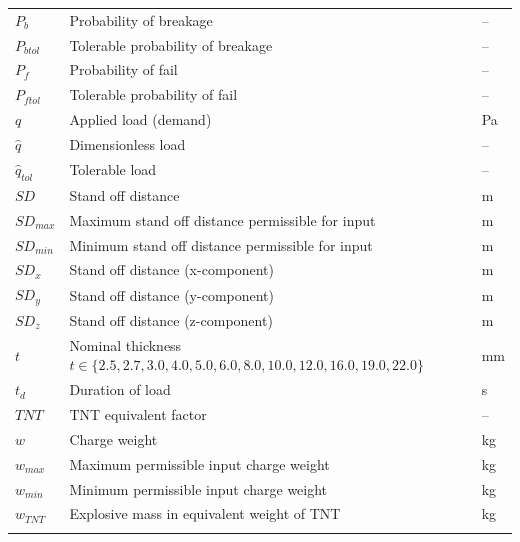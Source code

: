 \documentclass[12pt]{article}
\begin{document}
\begin{longtabu}{l X[l] l}
${P_{b}}$ & Probability of breakage & --
\\
${P_{btol}}$ & Tolerable probability of breakage & --
\\
${P_{f}}$ & Probability of fail & --
\\
${P_{ftol}}$ & Tolerable probability of fail & --
\\
$q$ & Applied load (demand) & Pa
\\
$\hat{q}$ & Dimensionless load & --
\\
${\hat{q}_{tol}}$ & Tolerable load & --
\\
$SD$ & Stand off distance & m
\\
${SD_{max}}$ & Maximum stand off distance permissible for input & m
\\
${SD_{min}}$ & Minimum stand off distance permissible for input & m
\\
${SD_{x}}$ & Stand off distance (x-component) & m
\\
${SD_{y}}$ & Stand off distance (y-component) & m
\\
${SD_{z}}$ & Stand off distance (z-component) & m
\\
$t$ & Nominal thickness $t\in{}\{2.5,2.7,3.0,4.0,5.0,6.0,8.0,10.0,12.0,16.0,19.0,22.0\}$ & mm
\\
${t_{d}}$ & Duration of load & s
\\
$TNT$ & TNT equivalent factor & --
\\
$w$ & Charge weight & kg
\\
${w_{max}}$ & Maximum permissible input charge weight & kg
\\
${w_{min}}$ & Minimum permissible input charge weight & kg
\\
${w_{TNT}}$ & Explosive mass in equivalent weight of TNT & kg
\\
\bottomrule
\label{Table:ToS}
\end{longtabu}
\end{document}
